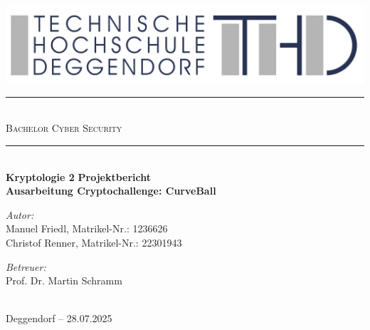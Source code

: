 \documentclass{article}
\begin{document}
\begin{titlepage}
  \begin{center}
    \includegraphics[width=\textwidth]{THD-Logo.pdf}
    \vspace{1cm}
    \rule{1\textwidth}{1mm} \\[0.3cm]
    \textsc{\scshape \huge Bachelor Cyber Security}\\
    \rule{1\textwidth}{1mm} \\[2cm]
    {
      \vspace{1cm}
      \Large \textbf{Kryptologie 2}
      \vspace{3cm}
      \Large \textbf{Projektbericht}
    }\\[0.5cm]
    \LARGE \textbf{Ausarbeitung Cryptochallenge: CurveBall}\\[2cm]
    \begin{minipage}[t]{0.4\textwidth}
      \begin{flushleft}
        \normalsize \emph{Autor:}\\[0.3cm]
        Manuel Friedl, Matrikel-Nr.: 1236626\\
        Christof Renner, Matrikel-Nr.: 22301943
      \end{flushleft}
    \end{minipage}
    \begin{minipage}[t]{0.5\textwidth}
      \begin{flushright}
        \normalsize \emph{Betreuer:}\\[0.3cm]
        Prof. Dr. Martin Schramm
      \end{flushright}
    \end{minipage}\\[3cm]
    {\large Deggendorf – 28.07.2025\\}
  \end{center}
\end{titlepage}

\newpage
{}
\thispagestyle{empty}

\newpage
\tableofcontents
\thispagestyle{empty}
\newpage

\setcounter{page}{1}
\end{document}
